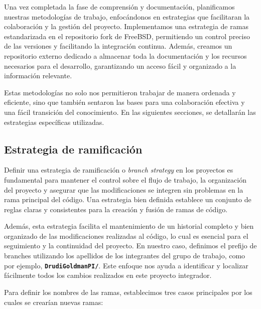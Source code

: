 Una vez completada la fase de comprensión y documentación, planificamos nuestras metodologías de trabajo, enfocándonos en estrategias que facilitaran la colaboración y la gestión del proyecto. Implementamos una estrategia de ramas estandarizada en el repositorio fork de FreeBSD, permitiendo un control preciso de las versiones y facilitando la integración continua. Además, creamos un repositorio externo dedicado a almacenar toda la documentación y los recursos necesarios para el desarrollo, garantizando un acceso fácil y organizado a la información relevante.\par

Estas metodologías no solo nos permitieron trabajar de manera ordenada y eficiente, sino que también sentaron las bases para una colaboración efectiva y una fácil transición del conocimiento. En las siguientes secciones, se detallarán las estrategias específicas utilizadas.\par

\subsection{Estrategia de ramificación}
Definir una estrategia de ramificación o \textit{branch strategy} en los proyectos es fundamental para mantener el control sobre el flujo de trabajo, la organización del proyecto y asegurar que las modificaciones se integren sin problemas en la rama principal del código. Una estrategia bien definida establece un conjunto de reglas claras y consistentes para la creación y fusión de ramas de código.\par

Además, esta estrategia facilita el mantenimiento de un historial completo y bien organizado de las modificaciones realizadas al código, lo cual es esencial para el seguimiento y la continuidad del proyecto. En nuestro caso, definimos el prefijo de branches utilizando los apellidos de los integrantes del grupo de trabajo, como por ejemplo, \texttt{\textbf{DrudiGoldmanPI/}}. Este enfoque nos ayuda a identificar y localizar fácilmente todos los cambios realizados en este proyecto integrador.\par

Para definir los nombres de las ramas, establecimos tres casos principales por los cuales se crearían nuevas ramas:

